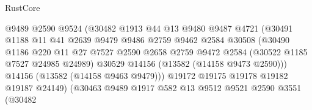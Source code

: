 \begin{lexlean}{RustCore}
\begin{coremodule}
                                      @9489
                                      @2590
                                      @9524
                                      (@30482
                                        @1913
                                        @44
                                        @13
                                        @9480
                                        @9487
                                        @4721
                                        (@30491
                                          @1188
                                          @11
                                          @41
                                          @2639
                                          @9479
                                          @9486
                                          @2759
                                          @9462
                                          @2584
                                          @30508
                                          (@30490
                                            @1186
                                            @220
                                            @11
                                            @27
                                            @7527
                                            @2590
                                            @2658
                                            @2759
                                            @9472
                                            @2584
                                            (@30522 @1185 @7527 @24985 @24989)
                                            @30529
                                            @14156
                                            (@13582 (@14158 @9473 @2590)))
                                          @14156
                                          (@13582 (@14158 @9463 @9479)))
                                        @19172
                                        @19175
                                        @19178
                                        @19182
                                        @19187
                                        @24149)
                                      (@30463
                                        @9489
                                        @1917
                                        @582
                                        @13
                                        @9512
                                        @9521
                                        @2590
                                        @3551
                                        (@30482

\end{coremodule}
\end{lexlean}
